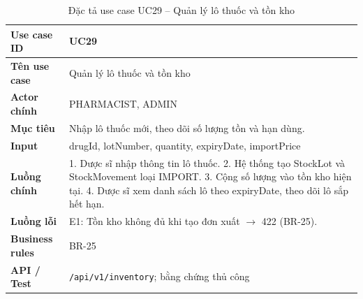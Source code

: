 \begin{table}[H]
\centering
\caption{Đặc tả use case UC29 -- Quản lý lô thuốc và tồn kho}
\label{tab:uc29}
\begin{tabularx}{\textwidth}{|p{3.6cm}|X|}
\hline
\textbf{Use case ID} & UC29 \\
\hline
\textbf{Tên use case} & Quản lý lô thuốc và tồn kho \\
\hline
\textbf{Actor chính} & PHARMACIST, ADMIN \\
\hline
\textbf{Mục tiêu} & Nhập lô thuốc mới, theo dõi số lượng tồn và hạn dùng. \\
\hline
\textbf{Input} & drugId, lotNumber, quantity, expiryDate, importPrice \\
\hline
\textbf{Luồng chính} & 1. Dược sĩ nhập thông tin lô thuốc. 2. Hệ thống tạo StockLot và StockMovement loại IMPORT. 3. Cộng số lượng vào tồn kho hiện tại. 4. Dược sĩ xem danh sách lô theo expiryDate, theo dõi lô sắp hết hạn. \\
\hline
\textbf{Luồng lỗi} & E1: Tồn kho không đủ khi tạo đơn xuất $\rightarrow$ 422 (BR-25). \\
\hline
\textbf{Business rules} & BR-25 \\
\hline
\textbf{API / Test} & \texttt{/api/v1/inventory}; bằng chứng thủ công \\
\hline
\end{tabularx}
\end{table}

